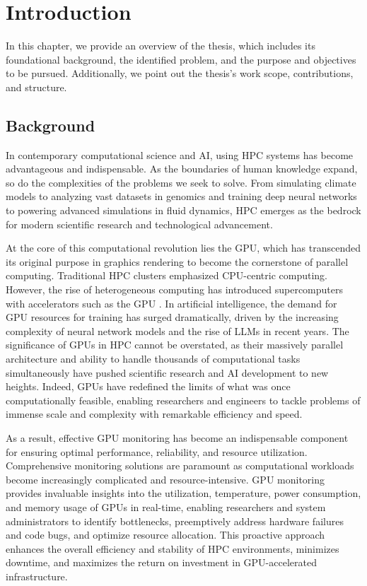 \chapter{Introduction}
\label{chap:introduction}
In this chapter, we provide an overview of the thesis, which includes its foundational background, the identified problem, and the purpose and objectives to be pursued. Additionally, we point out the thesis's work scope, contributions, and structure.

\section{Background}
In contemporary computational science and AI, using HPC systems has become advantageous and indispensable. As the boundaries of human knowledge expand, so do the complexities of the problems we seek to solve. From simulating climate models to analyzing vast datasets in genomics and training deep neural networks to powering advanced simulations in fluid dynamics, HPC emerges as the bedrock for modern scientific research and technological advancement.

At the core of this computational revolution lies the GPU, which has transcended its original purpose in graphics rendering to become the cornerstone of parallel computing. Traditional HPC clusters emphasized CPU-centric computing. However, the rise of heterogeneous computing has introduced supercomputers with accelerators such as the GPU \cite{5289128}. In artificial intelligence, the demand for GPU resources for training has surged dramatically, driven by the increasing complexity of neural network models and the rise of LLMs in recent years. The significance of GPUs in HPC cannot be overstated, as their massively parallel architecture and ability to handle thousands of computational tasks simultaneously have pushed scientific research and AI development to new heights. Indeed, GPUs have redefined the limits of what was once computationally feasible, enabling researchers and engineers to tackle problems of immense scale and complexity with remarkable efficiency and speed.

As a result, effective GPU monitoring has become an indispensable component for ensuring optimal performance, reliability, and resource utilization. Comprehensive monitoring solutions are paramount as computational workloads become increasingly complicated and resource-intensive. GPU monitoring provides invaluable insights into the utilization, temperature, power consumption, and memory usage of GPUs in real-time, enabling researchers and system administrators to identify bottlenecks, preemptively address hardware failures and code bugs, and optimize resource allocation. This proactive approach enhances the overall efficiency and stability of HPC environments, minimizes downtime, and maximizes the return on investment in GPU-accelerated infrastructure.

